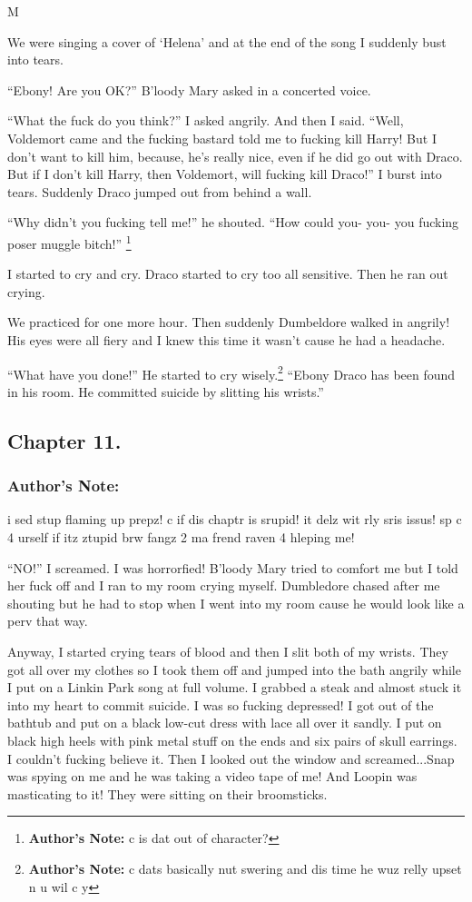 M\documentclass{article}
\begin{document}
We were singing a cover of ‘Helena’ and at the end of the song I suddenly bust into tears.

“Ebony! Are you OK?” B’loody Mary asked in a concerted voice.

“What the fuck do you think?” I asked angrily. And then I said. “Well, Voldemort came and the fucking bastard told me to fucking kill Harry! But I don’t want to kill him, because, he’s really nice, even if he did go out with Draco. But if I don’t kill Harry, then Voldemort, will fucking kill Draco!” I burst into tears.
Suddenly Draco jumped out from behind a wall.

“Why didn’t you fucking tell me!” he shouted. “How could you- you- you fucking poser muggle bitch!” \footnote{\textbf{Author's Note: }c is dat out of character?}

I started to cry and cry. Draco started to cry too all sensitive. Then he ran out crying.

We practiced for one more hour. Then suddenly Dumbeldore walked in angrily! His eyes were all fiery and I knew this time it wasn’t cause he had a headache.

“What have you done!” He started to cry wisely.\footnote{\textbf{Author's Note: }c dats basically nut swering and dis time he wuz relly upset n u wil c y} “Ebony Draco has been found in his room. He committed suicide by slitting his wrists.”

\clearpage\nolinenumbers
\subsection*{Chapter 11.}

\subsubsection*{Author's Note: }i sed stup flaming up prepz! c if dis chaptr is srupid! it delz wit rly sris issus! sp c 4 urself if itz ztupid brw fangz 2 ma frend raven 4 hleping me!

\textbreak
\linenumbers\resetlinenumber

“NO!” I screamed. I was horrorfied! B’loody Mary tried to comfort me but I told her fuck off and I ran to my room crying myself. Dumbledore chased after me shouting but he had to stop when I went into my room cause he would look like a perv that way.

Anyway, I started crying tears of blood and then I slit both of my wrists. They got all over my clothes so I took them off and jumped into the bath angrily while I put on a Linkin Park song at full volume. I grabbed a steak and almost stuck it into my heart to commit suicide. I was so fucking depressed! I got out of the bathtub and put on a black low-cut dress with lace all over it sandly. I put on black high heels with pink metal stuff on the ends and six pairs of skull earrings. I couldn’t fucking believe it. Then I looked out the window and screamed...Snap was spying on me and he was taking a video tape of me! And Loopin was masticating to it! They were sitting on their broomsticks.
\end{document}
